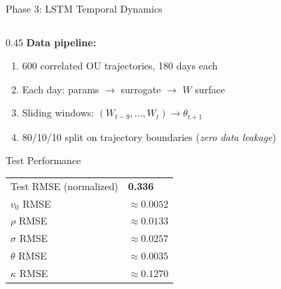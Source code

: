 \documentclass[aspectratio=169, 10pt]{beamer}
\begin{document}
\begin{frame}{Phase 3: LSTM Temporal Dynamics}
\begin{columns}[T]
    \begin{column}{0.45\textwidth}
      \textbf{Data pipeline:}
      \begin{enumerate}\small
        \item 600 correlated OU trajectories, 180 days each
        \item Each day: params $\to$ surrogate $\to$ $W$ surface
        \item Sliding windows: $(W_{t-9},\ldots,W_t)\to\theta_{t+1}$
        \item 80/10/10 split on trajectory boundaries
              (\emph{zero data leakage})
      \end{enumerate}
      \vspace{0.3em}
      \begin{block}{Test Performance}
        \small
        \begin{tabular}{@{}ll@{}}
          Test RMSE (normalized) & \textbf{0.336} \\
          $v_0$ RMSE & $\approx 0.0052$ \\
          $\rho$ RMSE & $\approx 0.0133$ \\
          $\sigma$ RMSE & $\approx 0.0257$ \\
          $\theta$ RMSE & $\approx 0.0035$ \\
          $\kappa$ RMSE & $\approx 0.1270$ \\
        \end{tabular}
      \end{block}
    \end{column}
  \end{columns}
\end{frame}
\end{document}
